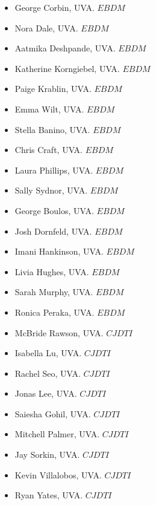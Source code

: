 \documentclass[10pt]{article}
\begin{document}
\begin{itemize}
\item George Corbin, UVA. $EBDM$
\item Nora Dale, UVA. $EBDM$
\item Aatmika Deshpande, UVA. $EBDM$
\item Katherine Korngiebel, UVA. $EBDM$
\item Paige Krablin, UVA. $EBDM$
\item Emma Wilt, UVA. $EBDM$
\item Stella Banino, UVA. $EBDM$
\item Chris Craft, UVA. $EBDM$
\item Laura Phillips, UVA. $EBDM$
\item Sally Sydnor, UVA. $EBDM$
\item George Boulos, UVA. $EBDM$
\item Josh Dornfeld, UVA. $EBDM$
\item Imani Hankinson, UVA. $EBDM$
\item Livia Hughes, UVA. $EBDM$
\item Sarah Murphy, UVA. $EBDM$
\item Ronica Peraka, UVA. $EBDM$
\item McBride Rawson, UVA. $CJDTI$
\item Isabella Lu, UVA. $CJDTI$
\item Rachel Seo, UVA. $CJDTI$
\item Jonas Lee, UVA. $CJDTI$
\item Saiesha Gohil, UVA. $CJDTI$
\item Mitchell Palmer, UVA. $CJDTI$
\item Jay Sorkin, UVA. $CJDTI$
\item Kevin Villalobos, UVA. $CJDTI$
\item Ryan Yates, UVA. $CJDTI$
\end{itemize}
\end{document}
